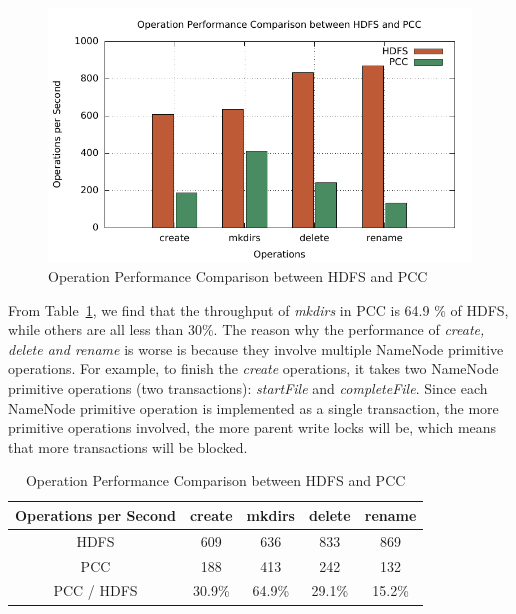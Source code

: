\begin{figure}[h]
	\centering
	\includegraphics[width=\linewidth]{figs/nn_100.pdf}
	\caption{Operation Performance Comparison between HDFS and PCC}
	\label{fig:nntp}
\end{figure}

\noindent From Table~\ref{table:nntpb}, we find that the throughput of \textit{mkdirs} in PCC is 64.9 \% of HDFS, while others are all less than 30\%. The reason why the performance of \textit{create, delete and rename} is worse is because they involve multiple NameNode primitive operations. For example, to finish the \textit{create} operations, it takes two NameNode primitive operations (two transactions): \textit{startFile} and \textit{completeFile}. Since each NameNode primitive operation is implemented as a single transaction, the more primitive operations involved, the more parent write locks will be, which means that more transactions will be blocked.

\begin{table}[h]
	\centering
	\begin{tabular}{|c|c|c|c|c|}
		\hline
		\textbf{Operations per Second} & \textbf{create} & \textbf{mkdirs} & \textbf{delete} & \textbf{rename} \\ \hline
		HDFS                           & 609             & 636             & 833             & 869             \\ \hline
		PCC                 & 188             & 413             & 242             & 132             \\ \hline
		PCC / HDFS              & 30.9\%          & 64.9\%          & 29.1\%          & 15.2\%          \\ \hline
	\end{tabular}
	\caption{Operation Performance Comparison between HDFS and PCC}
	\label{table:nntpb}
\end{table}

